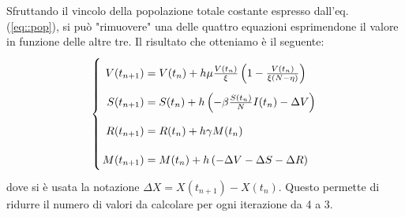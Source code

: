 \documentclass{article}
\begin{document}
Sfruttando il vincolo della popolazione totale costante espresso 
dall'eq. (\ref{eq::pop}), si può "rimuovere" una delle quattro 
equazioni esprimendone il valore in funzione delle altre tre.
Il risultato che otteniamo è il seguente:
\begin{equation}\label{eq::ezEvolve}
    \left\{ \arraycolsep=1.4pt\def\arraystretch{2.2}
    \begin{array}{rcl}
    V(t_{n+1}) & = & V(t_n) +h \mu \frac{V(t_n)}{\xi} \left(
        1 - \frac{V(t_n)}{\xi (N - \eta)} \right) \\
    S(t_{n+1}) & = & S(t_n) + h \left(-\beta \frac{S(t_n)}{N} I(t_n)
        - \Delta V \right) \\
    R(t_{n+1}) & = & R(t_n) + h \gamma M(t_n) \\
    M(t_{n+1}) & = & M(t_n) + h \left(-\Delta V - \Delta S - 
        \Delta R\right) \\
    \end{array}\right.
\end{equation}
dove si è usata la notazione $\Delta X = X(t_{n+1})-X(t_n)$. Questo
permette di ridurre il numero di valori da calcolare per ogni 
iterazione da 4 a 3.
\end{document}
